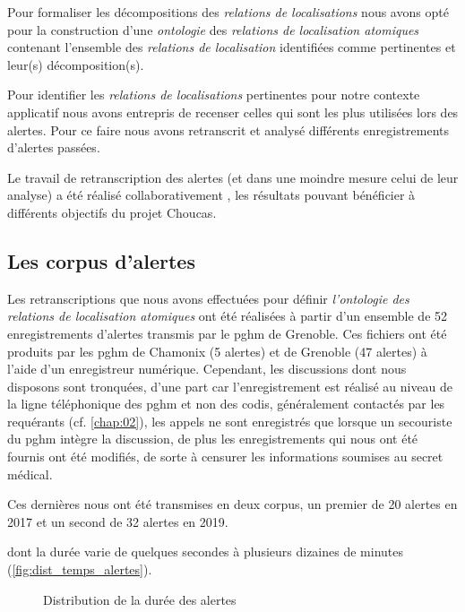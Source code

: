 Pour formaliser les décompositions des \emph{relations de
  localisations} nous avons opté pour la construction d'une
\emph{ontologie} des \emph{relations de localisation atomiques}
contenant l'ensemble des \emph{relations de localisation} identifiées
comme pertinentes et leur(s) décomposition(s).


Pour identifier les \emph{relations de localisations} pertinentes pour
notre contexte applicatif nous avons entrepris de recenser celles qui
sont les plus utilisées lors des alertes. Pour ce faire nous avons
retranscrit et analysé différents enregistrements d'alertes passées.

Le travail de retranscription des alertes (et dans une moindre mesure
celui de leur analyse) a été réalisé collaborativement
\autocite{Bunel2019}, les résultats pouvant bénéficier à différents
objectifs du projet Choucas.

\subsection{Les corpus d'alertes}

Les retranscriptions que nous avons effectuées pour définir
\emph{l'ontologie des relations de localisation atomiques} ont été
réalisées à partir d'un ensemble de 52 enregistrements d'alertes
transmis par le \ac{pghm} de Grenoble. Ces fichiers ont été produits
par les \ac{pghm} de Chamonix (5 alertes) et de Grenoble (47 alertes)
à l'aide d'un enregistreur numérique. Cependant, les discussions dont
nous disposons sont tronquées, d'une part car l'enregistrement est
réalisé au niveau de la ligne téléphonique des \ac{pghm} et non des
\ac{codis}, généralement contactés par les requérants
(cf. \autoref{chap:02}), les appels ne sont enregistrés que lorsque un
secouriste du \ac{pghm} intègre la discussion, de plus les
enregistrements qui nous ont été fournis ont été modifiés, de sorte à
censurer les informations soumises au secret médical.

Ces dernières nous ont été transmises en deux corpus, un premier de 20
alertes en 2017 et un second de 32 alertes en 2019.

dont la durée varie de quelques secondes à plusieurs dizaines de
minutes (\autoref{fig:dist_temps_alertes}).

\begin{figure}
  \centering
  
  \caption{Distribution de la durée des alertes}
  \label{fig:dist_temps_alertes}
\end{figure}

